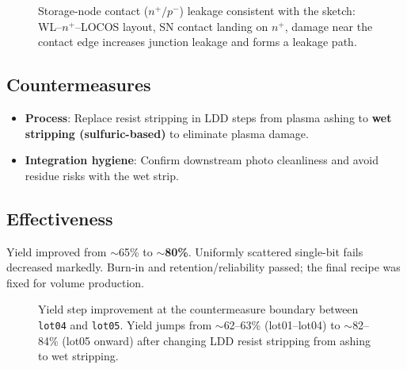 \begin{figure}[t]
  \caption{Storage-node contact ($n^+/p^-$) leakage consistent with the sketch:
  WL--$n^+$--LOCOS layout, SN contact landing on $n^+$, damage near the contact
  edge increases junction leakage and forms a leakage path.}
  \label{fig:storage_contact_tikz}
\end{figure}

\subsection{Countermeasures}
\begin{itemize}
  \item \textbf{Process}: Replace resist stripping in LDD steps from plasma ashing to \textbf{wet stripping (sulfuric-based)} to eliminate plasma damage. 
  \item \textbf{Integration hygiene}: Confirm downstream photo cleanliness and avoid residue risks with the wet strip.
\end{itemize}

\subsection{Effectiveness}
Yield improved from $\sim$65\% to \textbf{$\sim$80\%}. Uniformly scattered single-bit fails decreased markedly. Burn-in and retention/reliability passed; the final recipe was fixed for volume production.

\begin{figure}[t]
\centering
{}\yieldtbl
{}
\caption{Yield step improvement at the countermeasure boundary
between \texttt{lot04} and \texttt{lot05}. Yield jumps from $\sim$62--63\% 
(lot01--lot04) to $\sim$82--84\% (lot05 onward) after changing 
LDD resist stripping from ashing to wet stripping.}
\label{fig:yield}
\end{figure}
